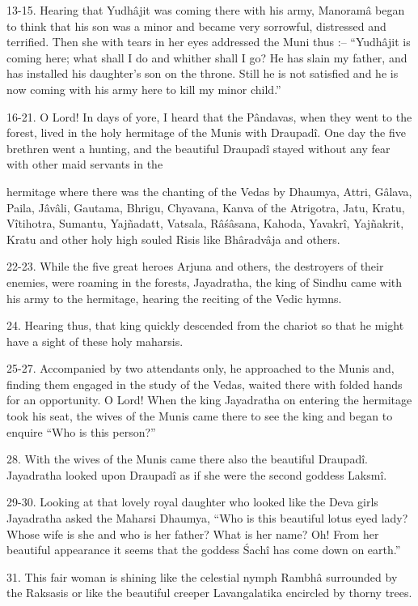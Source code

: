 13-15. Hearing that Yudh\^ajit was coming there with his army, Manoram\^a began to think that his son was a minor and became very sorrowful, distressed and terrified. Then she with tears in her eyes addressed the Muni thus :-- ``Yudh\^ajit is coming here; what shall I do and whither shall I go? He has slain my father, and has installed his daughter's son on the throne. Still he is not satisfied and he is now coming with his army here to kill my minor child.''

16-21. O Lord! In days of yore, I heard that the P\^andavas, when they went to the forest, lived in the holy hermitage of the Munis with Draupad\^i. One day the five brethren went a hunting, and the beautiful Draupad\^i stayed without any fear with other maid servants in the

hermitage where there was the chanting of the Vedas by Dhaumya, Attri, G\^alava, Paila, J\^av\^ali, Gautama, Bhrigu, Chyavana, Kanva of the Atrigotra, Jatu, Kratu, V\^itihotra, Sumantu, Yaj\~nadatt, Vatsala, R\^a\'s\^asana, Kahoda, Yavakr\^i, Yaj\~nakrit, Kratu and other holy high souled Risis like Bh\^aradv\^aja and others.

22-23. While the five great heroes Arjuna and others, the destroyers of their enemies, were roaming in the forests, Jayadratha, the king of Sindhu came with his army to the hermitage, hearing the reciting of the Vedic hymns.

24. Hearing thus, that king quickly descended from the chariot so that he might have a sight of these holy maharsis.

25-27. Accompanied by two attendants only, he approached to the Munis and, finding them engaged in the study of the Vedas, waited there with folded hands for an opportunity. O Lord! When the king Jayadratha on entering the hermitage took his seat, the wives of the Munis came there to see the king and began to enquire ``Who is this person?''

28. With the wives of the Munis came there also the beautiful Draupad\^i. Jayadratha looked upon Draupad\^i as if she were the second goddess Laksm\^i.

29-30. Looking at that lovely royal daughter who looked like the Deva girls Jayadratha asked the Maharsi Dhaumya, ``Who is this beautiful lotus eyed lady? Whose wife is she and who is her father? What is her name? Oh! From her beautiful appearance it seems that the goddess \'Sach\^i has come down on earth.''

31. This fair woman is shining like the celestial nymph Rambh\^a surrounded by the Raksasis or like the beautiful creeper Lavangalatika encircled by thorny trees.

